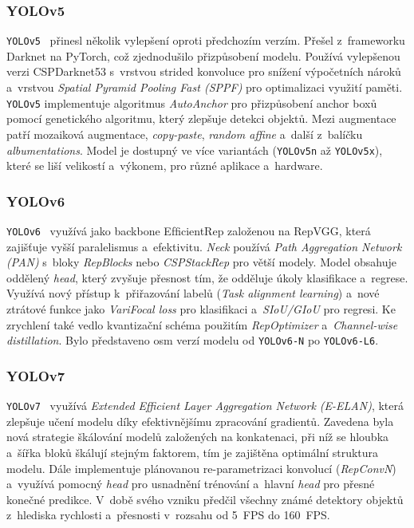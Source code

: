 \subsubsection*{YOLOv5}
\texttt{YOLOv5}~\cite{Terven} přinesl několik vylepšení oproti předchozím verzím. Přešel z~frameworku Darknet na PyTorch, což zjednodušilo přizpůsobení modelu. Používá vylepšenou verzi CSPDarknet53 s~vrstvou strided konvoluce pro snížení výpočetních nároků a~vrstvou \textit{Spatial Pyramid Pooling Fast (SPPF)} pro optimalizaci využití paměti. \texttt{YOLOv5} implementuje algoritmus \textit{AutoAnchor} pro přizpůsobení anchor boxů pomocí genetického algoritmu, který zlepšuje detekci objektů. Mezi augmentace patří mozaiková augmentace, \textit{copy-paste}, \textit{random affine} a~další z~balíčku \textit{albumentations}. Model je dostupný ve více variantách (\texttt{YOLOv5n} až \texttt{YOLOv5x}), které se liší velikostí a~výkonem, pro různé aplikace a~hardware.

\subsubsection*{YOLOv6}
\texttt{YOLOv6}~\cite{Terven} využívá jako backbone EfﬁcientRep založenou na RepVGG, která zajišťuje vyšší paralelismus a~efektivitu. \textit{Neck} používá \textit{Path Aggregation Network (PAN)} s~bloky \textit{RepBlocks} nebo \textit{CSPStackRep} pro větší modely. Model obsahuje oddělený \textit{head}, který zvyšuje přesnost tím, že odděluje úkoly klasifikace a~regrese. Využívá nový přístup k~přiřazování labelů (\textit{Task alignment learning}) a~nové ztrátové funkce jako \textit{VariFocal loss} pro klasifikaci a~\textit{SIoU/GIoU} pro regresi. Ke zrychlení také vedlo kvantizační schéma použitím \textit{RepOptimizer} a~\textit{Channel-wise distillation}. Bylo představeno osm verzí modelu od \texttt{YOLOv6-N} po \texttt{YOLOv6-L6}.

\subsubsection*{YOLOv7}
\texttt{YOLOv7}~\cite{Terven} využívá \textit{Extended Efficient Layer Aggregation Network (E-ELAN)}, která zlepšuje učení modelu díky efektivnějšímu zpracování gradientů. Zavedena byla nová strategie škálování modelů založených na konkatenaci, při níž se hloubka a~šířka bloků škálují stejným faktorem, tím je zajištěna optimální struktura modelu. Dále implementuje plánovanou re-parametrizaci konvolucí (\textit{RepConvN}) a~využívá pomocný \textit{head} pro usnadnění trénování a~hlavní \textit{head} pro přesné konečné predikce. V~době svého vzniku předčil všechny známé detektory objektů z~hlediska rychlosti a~přesnosti v~rozsahu od 5~FPS do 160~FPS.

